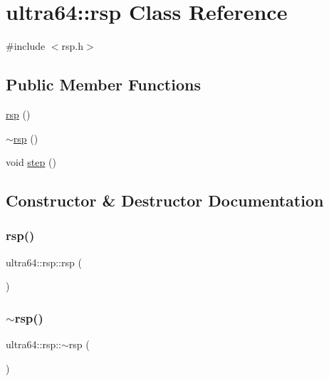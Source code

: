 \hypertarget{classultra64_1_1rsp}{}\section{ultra64\+:\+:rsp Class Reference}
\label{classultra64_1_1rsp}


{\ttfamily \#include $<$rsp.\+h$>$}

\subsection*{Public Member Functions}
\begin{DoxyCompactItemize}
\item 
\hyperlink{classultra64_1_1rsp_af573f798fee9c51b249bfe693689450c}{rsp} ()
\item 
\hyperlink{classultra64_1_1rsp_ac31547610349434e51969ed84c8c43ed}{$\sim$rsp} ()
\item 
void \hyperlink{classultra64_1_1rsp_a888d3e8dd8c86bbc512c6afed1922b9e}{step} ()
\end{DoxyCompactItemize}


\subsection{Constructor \& Destructor Documentation}
\mbox{\label{classultra64_1_1rsp_af573f798fee9c51b249bfe693689450c}} 
\subsubsection{\texorpdfstring{rsp()}{rsp()}}
{\footnotesize\ttfamily ultra64\+::rsp\+::rsp (\begin{DoxyParamCaption}{ }\end{DoxyParamCaption})}

\mbox{\label{classultra64_1_1rsp_ac31547610349434e51969ed84c8c43ed}} 
\subsubsection{\texorpdfstring{$\sim$rsp()}{~rsp()}}
{\footnotesize\ttfamily ultra64\+::rsp\+::$\sim$rsp (\begin{DoxyParamCaption}{ }\end{DoxyParamCaption})}



